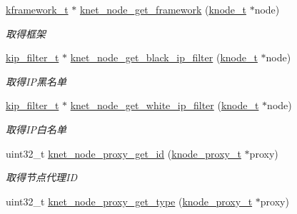 \begin{DoxyCompactItemize}
\hyperlink{a00066_a3195a3be35782fc1efb920c811be111d_a3195a3be35782fc1efb920c811be111d}{kframework\+\_\+t} $\ast$ \hyperlink{a00135_ga8cdcfd95182d97a0edd16d5c47adec51_ga8cdcfd95182d97a0edd16d5c47adec51}{knet\+\_\+node\+\_\+get\+\_\+framework} (\hyperlink{a00066_a5e720b27efbc9ad744240f5f4233763a_a5e720b27efbc9ad744240f5f4233763a}{knode\+\_\+t} $\ast$node)
\begin{DoxyCompactList}\small\item\em 取得框架 \end{DoxyCompactList}\item 
\hyperlink{a00066_a1c0c604eecd86fc8895cf4bbbba566af_a1c0c604eecd86fc8895cf4bbbba566af}{kip\+\_\+filter\+\_\+t} $\ast$ \hyperlink{a00135_ga41687a31d6d8d2ea196c628301d1bb2c_ga41687a31d6d8d2ea196c628301d1bb2c}{knet\+\_\+node\+\_\+get\+\_\+black\+\_\+ip\+\_\+filter} (\hyperlink{a00066_a5e720b27efbc9ad744240f5f4233763a_a5e720b27efbc9ad744240f5f4233763a}{knode\+\_\+t} $\ast$node)
\begin{DoxyCompactList}\small\item\em 取得\+I\+P黑名单 \end{DoxyCompactList}\item 
\hyperlink{a00066_a1c0c604eecd86fc8895cf4bbbba566af_a1c0c604eecd86fc8895cf4bbbba566af}{kip\+\_\+filter\+\_\+t} $\ast$ \hyperlink{a00135_ga41321abe67ec5ab6ff96a8b5ef29cb3d_ga41321abe67ec5ab6ff96a8b5ef29cb3d}{knet\+\_\+node\+\_\+get\+\_\+white\+\_\+ip\+\_\+filter} (\hyperlink{a00066_a5e720b27efbc9ad744240f5f4233763a_a5e720b27efbc9ad744240f5f4233763a}{knode\+\_\+t} $\ast$node)
\begin{DoxyCompactList}\small\item\em 取得\+I\+P白名单 \end{DoxyCompactList}\item 
uint32\+\_\+t \hyperlink{a00135_ga55eac38f861266b225e686fe86294b18_ga55eac38f861266b225e686fe86294b18}{knet\+\_\+node\+\_\+proxy\+\_\+get\+\_\+id} (\hyperlink{a00066_a5025c3e4422f5f55b981aad6e56b6d89_a5025c3e4422f5f55b981aad6e56b6d89}{knode\+\_\+proxy\+\_\+t} $\ast$proxy)
\begin{DoxyCompactList}\small\item\em 取得节点代理\+I\+D \end{DoxyCompactList}\item 
uint32\+\_\+t \hyperlink{a00135_gaa2890b2f9fe57b8f45677da321350f41_gaa2890b2f9fe57b8f45677da321350f41}{knet\+\_\+node\+\_\+proxy\+\_\+get\+\_\+type} (\hyperlink{a00066_a5025c3e4422f5f55b981aad6e56b6d89_a5025c3e4422f5f55b981aad6e56b6d89}{knode\+\_\+proxy\+\_\+t} $\ast$proxy)

\end{DoxyCompactItemize}
